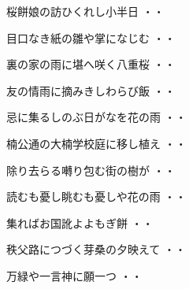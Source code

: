 \begin{shiika}桜餅娘の訪ひくれし小半日
\hfill{・・}\end{shiika}
\vspace{0.6cm}
\begin{shiika}目口なき紙の雛や掌になじむ
\hfill{・・}\end{shiika}
\vspace{0.6cm}
\begin{shiika}裏の家の雨に堪へ咲く八重桜
\hfill{・・}\end{shiika}
\vspace{0.6cm}
\begin{shiika}友の情雨に摘みきしわらび飯
\hfill{・・}\end{shiika}
\vspace{0.6cm}
\begin{shiika}忌に集るしのぶ日がなを花の雨
\hfill{・・}\end{shiika}
\vspace{0.6cm}
\begin{shiika}楠公通の大楠学校庭に移し植え
\hfill{・・}\end{shiika}
\vspace{0.6cm}
\begin{shiika}除り去らる囀り包む街の樹が
\hfill{・・}\end{shiika}
\vspace{0.6cm}
\begin{shiika}読むも憂し眺むも憂しや花の雨
\hfill{・・}\end{shiika}
\vspace{0.6cm}
\begin{shiika}集ればお国訛よよもぎ餅
\hfill{・・}\end{shiika}
\vspace{0.6cm}
\begin{shiika}秩父路につづく芽桑の夕映えて
\hfill{・・}\end{shiika}
\vspace{0.6cm}
\begin{shiika}万緑や一言神に願一つ
\hfill{・・}\end{shiika}
\vspace{0.6cm}
